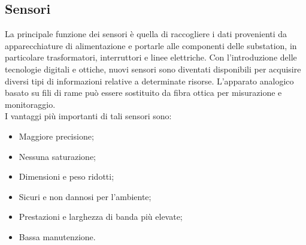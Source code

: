 \subsection{Sensori}
La principale funzione dei sensori è quella di raccogliere i dati provenienti da apparecchiature di alimentazione e portarle alle componenti delle substation, in particolare trasformatori, interruttori e linee elettriche. Con l'introduzione delle tecnologie digitali e ottiche, nuovi sensori sono diventati disponibili per acquisire diversi tipi di informazioni relative a determinate risorse. L'apparato analogico basato su fili di rame può essere sostituito da fibra ottica per misurazione e monitoraggio.
\\
I vantaggi più importanti di tali sensori sono:
\begin{itemize}
	\item Maggiore precisione;
	\item Nessuna saturazione;
	\item Dimensioni e peso ridotti;
	\item Sicuri e non dannosi per l'ambiente;
	\item Prestazioni e larghezza di banda più elevate;
	\item Bassa manutenzione.
\end{itemize}


